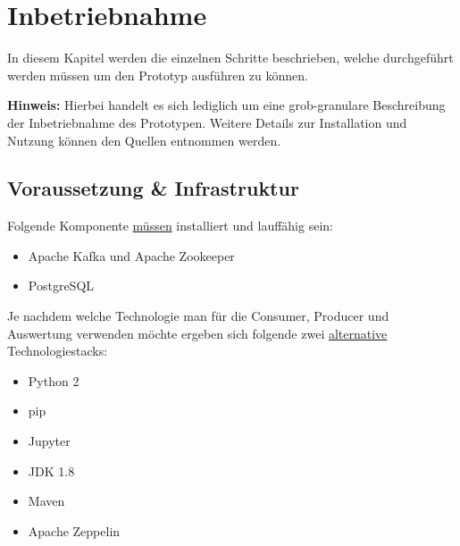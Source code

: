 \chapter{Inbetriebnahme}
\label{chap:betrieb}
In diesem Kapitel werden die einzelnen Schritte beschrieben, welche durchgeführt werden müssen um den Prototyp ausführen zu können.

\textbf{Hinweis:}
\newline
Hierbei handelt es sich lediglich um eine grob-granulare Beschreibung der Inbetriebnahme des Prototypen.
Weitere Details zur Installation und Nutzung können den Quellen entnommen werden.

\section{Voraussetzung \& Infrastruktur}
Folgende Komponente \underline{müssen}  installiert und lauffähig sein:
\begin{itemize}
  \item Apache Kafka und Apache Zookeeper
  \item PostgreSQL
\end{itemize}


Je nachdem welche Technologie man für die Consumer, Producer und Auswertung verwenden möchte ergeben sich folgende zwei \underline{alternative} Technologiestacks:
\setlength{\columnseprule}{1pt}
\def\columnseprulecolor{\color{black}}
\begin{multicols}{2}
	\begin{itemize}
		\item Python 2
		\item pip
		\item Jupyter
	\end{itemize}
\columnbreak
	\begin{itemize}
		\item JDK 1.8
		\item Maven
		\item Apache Zeppelin
	\end{itemize}
\end{multicols}

